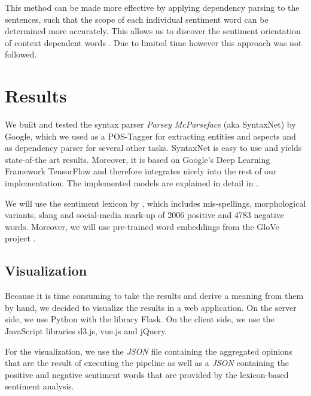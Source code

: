 \documentclass[10pt,a4paper]{article}
\begin{document}
		This method can be made more effective by applying dependency parsing to the sentences, such that the scope of each individual sentiment word can be determined more accurately. This allows us to discover the sentiment orientation of context dependent words \cite{Liu12sentimentanalysis}. Due to limited time however this approach was not followed.


	\section{Results}
	
	We built and tested the syntax parser \textit{Parsey McParseface} (aka SyntaxNet) by Google, which we used as a POS-Tagger for extracting entities and aspects and as dependency parser for several other tasks. SyntaxNet is easy to use and yields state-of-the art results. Moreover, it is based on Google's Deep Learning Framework TensorFlow and therefore integrates nicely into the rest of our implementation. The implemented models are explained in detail in \cite{DBLP:journals/corr/AndorAWSPGPC16}.
	
	
	We will use the sentiment lexicon by \cite{Hu:2004:MSC:1014052.1014073}, which includes mis-spellings, morphological variants, slang and social-media mark-up of 2006 positive and 4783 negative words. Moreover, we will use pre-trained word embeddings from the GloVe project \cite{pennington2014glove}.
	
	
	
	\subsection{Visualization}

	Because it is time consuming to take the results and derive a meaning from them by hand, we decided to visualize the results in a web application. On the server side, we use Python with the library Flask. On the client side, we use the JavaScript libraries d3.js, vue.js and jQuery.
	
	For the visualization, we use the \textit{JSON} file containing the aggregated opinions that are the result of executing the pipeline as well as a \textit{JSON} containing the positive and negative sentiment words that are provided by the lexicon-based sentiment analysis.
	
\end{document}
